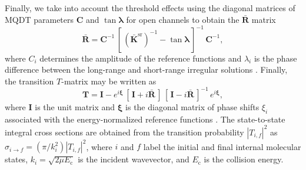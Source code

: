 \documentclass[reprint,amssymb,noeprint,twocolumn,longbibliography]{revtex4-2}
\begin{document}
Finally, we take into account the threshold effects  using the diagonal matrices of MQDT parameters $\bm{C}$ and $\tan{\bm{\lambda}}$ for open channels to obtain the $\bar{\bm{R}}$ matrix 
\begin{equation}
\bar{\bm{R}}=\bm{C}^{-1}\,[\,({\bar{\bm{K}}^\text{sr}})^{-1}-\tan{\bm{\lambda}} \,]^{-1}\,\bm{C}^{-1},
\label{eq:Rbar}
\end{equation}
where $C_i$ determines the amplitude of the reference functions and $\lambda_i$ is the phase difference between the long-range and short-range irregular solutions \cite{Raoult_04}.
Finally, the  transition $T$-matrix may be written as 
\begin{equation}
\bm{T}=\bm{I}-e^{i\bm{\xi}}\,[\,\bm{I}+i\bar{\bm{R}} \,]\,[\,\bm{I} - i\bar{\bm{R}} \,]^{-1}\,e^{i\bm{\xi}},
\label{eq:Smatrix}
\end{equation}
where $\bm{I}$ is the unit matrix and $\bm{\xi}$ is the diagonal matrix of phase shifts $\xi_i$ associated with the energy-normalized reference functions  \cite{Mies_84,Mies_00,Raoult_04,Croft_11,Croft_12}. The state-to-state integral cross sections are 
obtained from the transition probability $|T_{i,f}|^2$ as
$\sigma_{i \to f}=(\pi/k_i^2)|T_{i,f}|^2$, where $i$ and $f$ label the initial and final internal molecular states, $k_i=\sqrt{2\mu E_\mathrm{c}}$ is the incident wavevector, and $E_\mathrm{c}$ is the collision energy.
\end{document}

